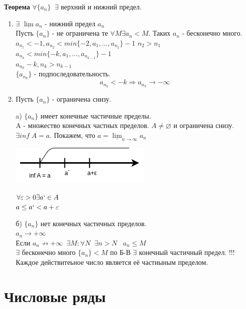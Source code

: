 \documentclass[12pt, paper]{article}
\newcommand{\eps}{\varepsilon}
\begin{document}
\textbf{Теорема} $\forall \{a_n\} \;\; \exists$ верхний и нижний предел.
\begin{tcolorbox}
    \begin{enumerate}
        \item $\exists$ $\underline{\lim} a_n$ - нижний предел $a_n$\\
        Пусть $\{a_n\}$ - не ограничена те $\forall M \exists a_n < M$. Таких $a_n$ - бесконечно много.\\
        $a_{n_1} < -1, a_{n_2} < min\{ -2, a_1, ..., a_{n_1} \} - 1$
        $n_2 > n_1$\\
        $a_{n_k} < min\{-k, a_1, ..., a_{n_{k-1}}\} - 1$\\
        $a_{n_k} - k, n_k > n_{k-1}$\\
        $\{a_{n_k}\}$ - подпоследовательность.\\
        \[ a_{n_k} < -k \Rightarrow a_{n_k} \to -\infty \]
        \item Пусть $\{ a_n \}$ - ограничена снизу.
            \item[a)] $\{a_n\}$  имеет конечные частичные пределы.\\
            A - множество конечных частных пределов. $A \not= \varnothing$ и ограничена снизу.\\
            $\exists inf\; A = a$. Покажем, что $a = \underline{\lim}_{n\to\infty} a_n$
            \begin{center}
                \includegraphics[width=0.2\linewidth]{images/Пределы.png}
            \end{center}
            $ \forall \eps > 0 \exists a` \in A $\\
            $a \leq a` < a+\eps$
            \item[б)] $\{a_n\}$ нет конечных частичных пределов.\\
            $a_n \to +\infty$\\
            Если $a_n \not\to +\infty \;\; \exists M: \forall N \;\; \exists n > N\;\;\; a _n\leq M$ \\
            $\exists$ бесконечно много $\{a_n\} < M$ по Б-В $\exists$ конечный частичный предел.
    !!! Каждое действитеьное число является её частиыным пределом.
    \end{enumerate}
\end{tcolorbox}

\section{Числовые ряды}
\end{document}
